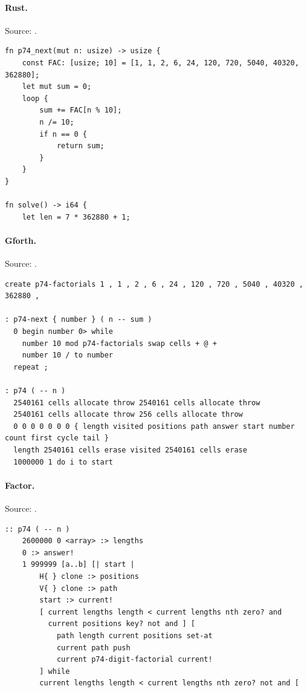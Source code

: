 \paragraph{Rust.} Source: .
\begin{lstlisting}
fn p74_next(mut n: usize) -> usize {
    const FAC: [usize; 10] = [1, 1, 2, 6, 24, 120, 720, 5040, 40320, 362880];
    let mut sum = 0;
    loop {
        sum += FAC[n % 10];
        n /= 10;
        if n == 0 {
            return sum;
        }
    }
}

fn solve() -> i64 {
    let len = 7 * 362880 + 1;
\end{lstlisting}

\paragraph{Gforth.} Source: .
\begin{lstlisting}
create p74-factorials 1 , 1 , 2 , 6 , 24 , 120 , 720 , 5040 , 40320 , 362880 ,

: p74-next { number } ( n -- sum )
  0 begin number 0> while
    number 10 mod p74-factorials swap cells + @ +
    number 10 / to number
  repeat ;

: p74 ( -- n )
  2540161 cells allocate throw 2540161 cells allocate throw
  2540161 cells allocate throw 256 cells allocate throw
  0 0 0 0 0 0 0 { length visited positions path answer start number count first cycle tail }
  length 2540161 cells erase visited 2540161 cells erase
  1000000 1 do i to start
\end{lstlisting}

\paragraph{Factor.} Source: .
\begin{lstlisting}
:: p74 ( -- n )
    2600000 0 <array> :> lengths
    0 :> answer!
    1 999999 [a..b] [| start |
        H{ } clone :> positions
        V{ } clone :> path
        start :> current!
        [ current lengths length < current lengths nth zero? and
          current positions key? not and ] [
            path length current positions set-at
            current path push
            current p74-digit-factorial current!
        ] while
        current lengths length < current lengths nth zero? not and [
\end{lstlisting}

